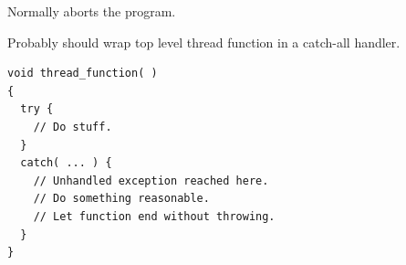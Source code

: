 \documentclass[landscape]{slides}
\begin{document}
\begin{citemize}
\item Normally aborts the  program.
\item Probably should wrap top level thread function in a catch-all handler.
\end{citemize}
\vspace{5mm}
{\small
\begin{lstlisting}
void thread_function( )
{
  try {
    // Do stuff.
  }
  catch( ... ) {
    // Unhandled exception reached here.
    // Do something reasonable.
    // Let function end without throwing.
  }
}
\end{lstlisting}
}
\stopslide

%
\end{document}
